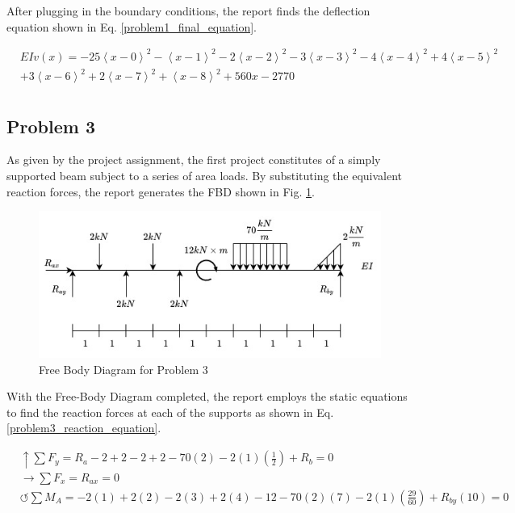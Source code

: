 \documentclass[a4paper]{article}
\begin{document}
After plugging in the boundary conditions, the report finds the deflection equation shown in Eq. \ref{problem1_final_equation}.

\begin{equation}
\begin{split}
  & EI v(x) = - 25\left<x-0\right>^2 - \left<x-1\right>^2 - 2\left<x-2\right>^2 -  3\left<x-3\right>^2 - 4\left<x-4\right>^2   +  4\left<x-5\right>^2 \\
& + 3\left<x-6\right>^2  +  2\left<x-7\right>^2 + \left<x-8\right>^2 + 560 x - 2770 \\
\end{split}
\label{problem1_final_equation}
\end{equation}



\subsection{Problem 3}

As given by the project assignment, the first project constitutes of a simply supported beam subject to a series of area loads. By substituting the equivalent reaction forces, the report generates the FBD shown in Fig. \ref{FBD_3}.

\begin{figure}[h]
\includegraphics[width=\textwidth]{FBD/FBD_3.jpg}
\caption{Free Body Diagram for Problem 3}
\label{FBD_3}
\end{figure}

With the Free-Body Diagram completed, the report employs the static equations to find the reaction forces at each of the supports as shown in Eq. \ref{problem3_reaction_equation}.

\begin{equation}
\begin{split}
	&\uparrow \sum F_y = R_a - 2 + 2 - 2 + 2 - 70(2) - 2(1)\left(\frac{1}{2}\right) + R_b = 0 \\
 	&\rightarrow \sum F_x = R_{ax} = 0 \\
 	&\circlearrowleft \sum M_A = -2(1) + 2(2) - 2(3) + 2(4) - 12 - 70(2)(7) - 2(1)\left(\frac{29}{60}\right) + R_{by}(10) = 0 \\
\end{split}
\label{problem3_reaction_equation}
\end{equation}
\end{document}
